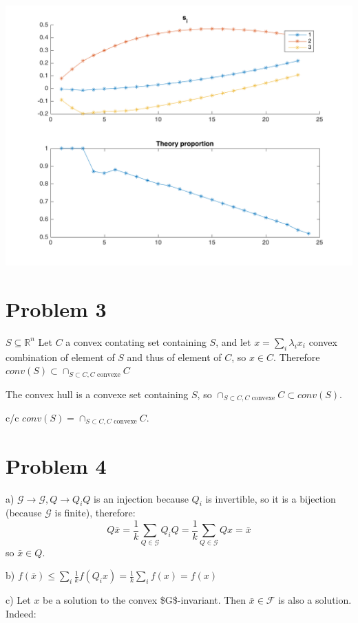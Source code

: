 \documentclass[11pt]{article}
\begin{document}
\begin{center}
\includegraphics[width=.9\linewidth]{./img/plan4.png}
\end{center}


\section{Problem 3}
\label{sec:orgheadline3}
\(S \subseteq \mathbb R^n\)
Let \(C\) a convex contating set containing \(S\), and let \(x = \sum_i \lambda_i x_i\) convex combination of element of \(S\) and thus of element of \(C\), so \(x \in C\). Therefore \(conv(S) \subset \cap_{S \subset C, C \text{ convexe}} C\)

The convex hull is a convexe set containing \(S\), so \(\cap_{S \subset C, C \text{ convexe}} C \subset  conv(S)\).

c/c \(conv(S) = \cap_{S \subset C, C \text{ convexe}} C\).


\section{Problem 4}
\label{sec:orgheadline4}
a)
\(\mathcal G \rightarrow \mathcal G, Q \rightarrow Q_iQ\)  is an injection because \(Q_i\) is invertible, so it is a bijection (because \(\mathcal G\) is finite), therefore:
$$Q\bar x = \frac1k \sum_{Q \in \mathcal G} Q_iQ = \frac1k \sum_{Q \in \mathcal G} Qx = \bar x$$
so \(\bar x \in Q\).

b) \(f(\bar x) \le \sum_i \frac1k f(Q_ix) = \frac1k \sum_i  f(x) = f(x)\)

c) Let \(x\) be a solution to the convex \$\mathcal G\$-invariant. Then \(\bar x \in \mathcal F\) is also a solution. Indeed:
\end{document}

